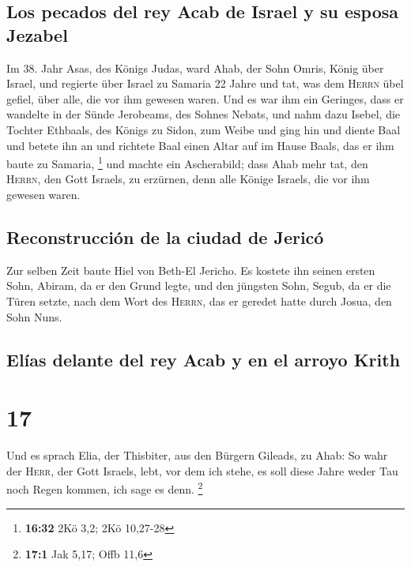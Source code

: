\hypertarget{los-pecados-del-rey-acab-de-israel-y-su-esposa-jezabel}{%
\subsection{Los pecados del rey Acab de Israel y su esposa
Jezabel}\label{los-pecados-del-rey-acab-de-israel-y-su-esposa-jezabel}}

 Im 38. Jahr Asas, des Königs Judas, ward Ahab, der Sohn
Omris, König über Israel, und regierte über Israel zu Samaria 22 Jahre
 und tat, was dem \textsc{Herrn} übel gefiel, über alle,
die vor ihm gewesen waren.  Und es war ihm ein Geringes,
dass er wandelte in der Sünde Jerobeams, des Sohnes Nebats, und nahm
dazu Isebel, die Tochter Ethbaals, des Königs zu Sidon, zum Weibe und
ging hin und diente Baal und betete ihn an  und richtete
Baal einen Altar auf im Hause Baals, das er ihm baute zu Samaria,
\footnote{\textbf{16:32} 2Kö 3,2; 2Kö 10,27-28}  und
machte ein Ascherabild; dass Ahab mehr tat, den \textsc{Herrn}, den Gott
Israels, zu erzürnen, denn alle Könige Israels, die vor ihm gewesen
waren.

\hypertarget{reconstrucciuxf3n-de-la-ciudad-de-jericuxf3}{%
\subsection{Reconstrucción de la ciudad de
Jericó}\label{reconstrucciuxf3n-de-la-ciudad-de-jericuxf3}}

 Zur selben Zeit baute Hiel von Beth-El Jericho. Es
kostete ihn seinen ersten Sohn, Abiram, da er den Grund legte, und den
jüngsten Sohn, Segub, da er die Türen setzte, nach dem Wort des
\textsc{Herrn}, das er geredet hatte durch Josua, den Sohn Nuns.

\hypertarget{eluxedas-delante-del-rey-acab-y-en-el-arroyo-krith}{%
\subsection{Elías delante del rey Acab y en el arroyo
Krith}\label{eluxedas-delante-del-rey-acab-y-en-el-arroyo-krith}}

\hypertarget{section-16}{%
\section{17}\label{section-16}}

 Und es sprach Elia, der Thisbiter, aus den Bürgern
Gileads, zu Ahab: So wahr der \textsc{Herr}, der Gott Israels, lebt, vor
dem ich stehe, es soll diese Jahre weder Tau noch Regen kommen, ich sage
es denn. \footnote{\textbf{17:1} Jak 5,17; Offb 11,6}

